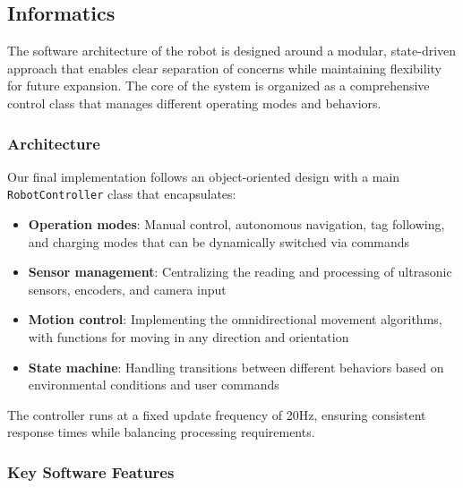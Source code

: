 \subsection{Informatics}

The software architecture of the robot is designed around a modular, state-driven approach that enables clear separation of concerns while maintaining flexibility for future expansion. The core of the system is organized as a comprehensive control class that manages different operating modes and behaviors.

\subsubsection{Architecture}

Our final implementation follows an object-oriented design with a main \texttt{RobotController} class that encapsulates:

\begin{itemize}
    \item \textbf{Operation modes}: Manual control, autonomous navigation, tag following, and charging modes that can be dynamically switched via commands
    
    \item \textbf{Sensor management}: Centralizing the reading and processing of ultrasonic sensors, encoders, and camera input
    
    \item \textbf{Motion control}: Implementing the omnidirectional movement algorithms, with functions for moving in any direction and orientation
    
    \item \textbf{State machine}: Handling transitions between different behaviors based on environmental conditions and user commands
\end{itemize}

The controller runs at a fixed update frequency of 20Hz, ensuring consistent response times while balancing processing requirements.

\subsubsection{Key Software Features}

